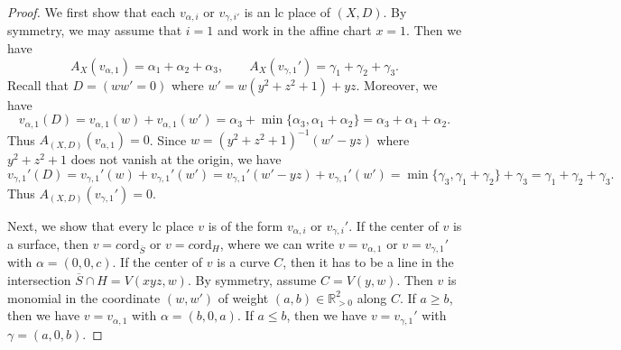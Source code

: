 \documentclass[reqno, 12pt]{amsart}
\theoremstyle{definition}
\newcommand{\bR}{\mathbb{R}}
\newcommand{\ord}{\mathrm{ord}}
\newcommand{\oS}{\overline{S}}
\numberwithin{equation}{section}
\begin{document}
\begin{proof}
We first show that each $v_{\alpha,i}$ or $v_{\gamma,i'}$ is an lc place of $(X,D)$. By symmetry, we may assume that $i = 1$ and work in the affine chart $x = 1$. Then we have
\[
A_{X}(v_{\alpha,1}) = \alpha_1 + \alpha_2 + \alpha_3, \qquad A_{X}(v_{\gamma,1}') = \gamma_1+\gamma_2+\gamma_3.
\]
Recall that $D= (w w'=0)$ where $w'=w(y^2 + z^2 + 1) + yz$.
Moreover, we have 
\[
v_{\alpha,1}(D) = v_{\alpha,1}(w) + v_{\alpha,1}(w') = \alpha_3 + \min \{\alpha_3, \alpha_1+\alpha_2\}= \alpha_3 + \alpha_1 + \alpha_2.
\]
Thus $A_{(X,D)}(v_{\alpha, 1}) = 0$. Since $ w= (y^2+z^2+1)^{-1}( w' - yz)$ where $y^2 + z^2 + 1$ does not vanish at the origin, we have 
\[
v_{\gamma,1}' (D) = v_{\gamma,1}'(w) + v_{\gamma,1}'(w') = v_{\gamma,1}'(w' - yz) + v_{\gamma,1}'(w')  = \min\{\gamma_3, \gamma_1+\gamma_2 \} + \gamma_3 =  \gamma_1 + \gamma_2 + \gamma_3.
\]
Thus $A_{(X,D)}(v_{\gamma, 1}') = 0$.

Next, we show that every lc place $v$ is of the form $v_{\alpha,i}$ or $v_{\gamma, i}'$. If the center of $v$ is a surface, then $v=c\ord_{\oS}$ or $v = c\ord_H$, where we can write $v = v_{\alpha,1}$ or $v=v_{\gamma,1}'$ with $\alpha = (0,0,c)$. If the center of $v$ is a curve $C$, then it has to be a line in the intersection $\oS\cap H = V(xyz, w)$. By symmetry, assume $C= V(y,w)$. Then $v$ is monomial in the coordinate $(w,w')$ of weight $(a,b)\in \bR_{>0}^2$ along $C$. If $a\geq b$, then we have $v = v_{\alpha, 1}$ with $\alpha = (b,0,a)$. If $a \leq b$, then we have $v = v_{\gamma, 1}'$ with $\gamma = (a,0,b)$. 


\end{proof}
\end{document}
